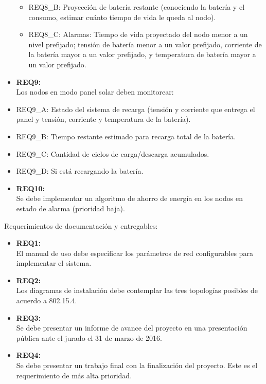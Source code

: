 \begin{itemize}
\begin{itemize}
		\item REQ8\_B: Proyección de batería restante (conociendo la batería y el consumo, estimar cuánto tiempo de vida le queda al nodo).
		\item REQ8\_C: Alarmas: Tiempo de vida proyectado del nodo menor a un nivel prefijado; tensión de batería menor a un valor prefijado, corriente de la batería mayor a un valor prefijado, y temperatura de batería mayor a un valor prefijado.
		\end{itemize}
	\item \textbf{REQ9:}\\Los nodos en modo panel solar deben monitorear:
		\item REQ9\_A: Estado del sistema de recarga (tensión y corriente que entrega el panel y tensión, corriente y temperatura de la batería).
		\item REQ9\_B: Tiempo restante estimado para recarga total de la batería.
		\item REQ9\_C: Cantidad de ciclos de carga/descarga acumulados.
		\item REQ9\_D: Si está recargando la batería.
	\item \textbf{REQ10:}\\Se debe implementar un algoritmo de ahorro de energía en los nodos en estado de alarma (prioridad baja).
\end{itemize}

\noindent Requerimientos de documentación y entregables:
\begin{itemize}
	\item \textbf{REQ1:}\\ El manual de uso debe especificar los parámetros de red configurables para implementar el sistema.
	\item \textbf{REQ2:}\\ Los diagramas de instalación debe contemplar las tres topologías posibles de acuerdo a 802.15.4.
	\item \textbf{REQ3:}\\ Se debe presentar un informe de avance del proyecto en una presentación pública ante el jurado el 31 de marzo de 2016.
	\item \textbf{REQ4:}\\ Se debe presentar un trabajo final con la finalización del proyecto. Este es el requerimiento de más alta prioridad.	
\end{itemize}

\clearpage

